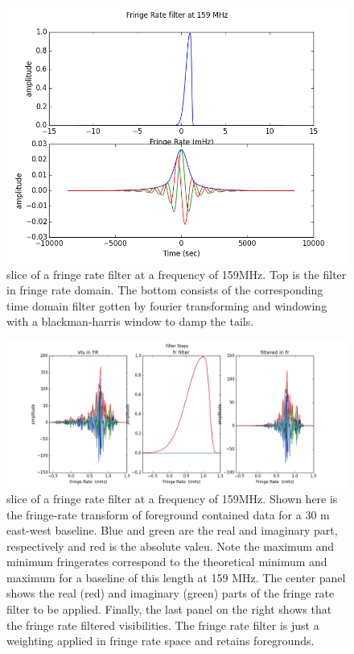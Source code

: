 \documentclass[twocolumn,numberedappendix]{emulateapj}
\begin{document}
\begin{figure}
\centering
\includegraphics[width=\columnwidth]{plots/fr_filter_slice.png}
\caption{slice of a fringe rate filter at a frequency of 159MHz. Top is the
filter in fringe rate domain. The bottom consists of the corresponding time
domain filter gotten by fourier transforming and windowing with a
blackman-harris window to damp the tails.}
\label{fig:fringe_rate_cut}
\end{figure}

\begin{figure}[t!]\centering
\includegraphics[width=2\columnwidth]{plots/fr_preserved_signal.png}
\caption{slice of a fringe rate filter at a frequency of 159MHz. Shown here is
the fringe-rate transform of foreground contained data for a 30 m east-west
baseline. Blue and green are the real and imaginary part, respectively and red
is the absolute valeu. Note the maximum and minimum fringerates correspond to
the theoretical minimum and maximum for a baseline of this length at 159 MHz.
The center panel shows the real (red)  and imaginary (green) parts of the fringe
rate filter to be applied. Finally, the last panel on the right shows that the
fringe rate filtered visibilities. The fringe rate filter is just a weighting
applied in fringe rate space and retains foregrounds.}
\label{fig:fr_preserved_signal}
\end{figure}
\end{document}
